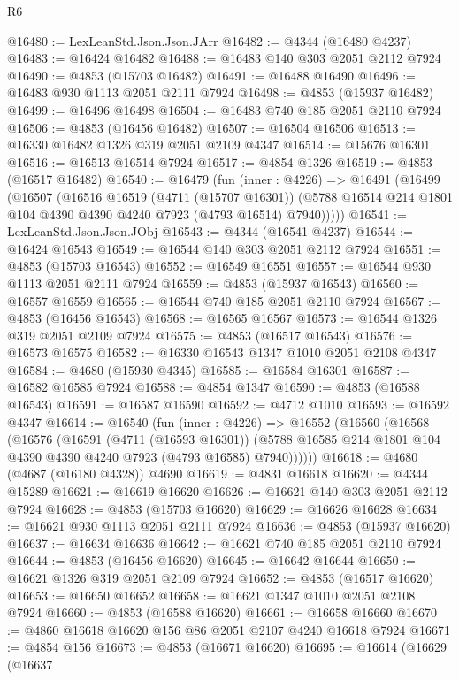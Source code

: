 \begin{lexlean}{R6}
\begin{coremodule}
@16480 := LexLeanStd.Json.Json.JArr
@16482 := @4344 (@16480 @4237)
@16483 := @16424 @16482
@16488 := @16483 @140 @303 @2051 @2112 @7924
@16490 := @4853 (@15703 @16482)
@16491 := @16488 @16490
@16496 := @16483 @930 @1113 @2051 @2111 @7924
@16498 := @4853 (@15937 @16482)
@16499 := @16496 @16498
@16504 := @16483 @740 @185 @2051 @2110 @7924
@16506 := @4853 (@16456 @16482)
@16507 := @16504 @16506
@16513 := @16330 @16482 @1326 @319 @2051 @2109 @4347
@16514 := @15676 @16301
@16516 := @16513 @16514 @7924
@16517 := @4854 @1326
@16519 := @4853 (@16517 @16482)
@16540 := @16479
    (fun (inner : @4226) =>
    @16491
      (@16499
        (@16507
          (@16516
            @16519
            (@4711 (@15707 @16301))
            (@5788 @16514 @214 @1801 @104 @4390 @4390 @4240 @7923 (@4793 @16514) @7940)))))
@16541 := LexLeanStd.Json.Json.JObj
@16543 := @4344 (@16541 @4237)
@16544 := @16424 @16543
@16549 := @16544 @140 @303 @2051 @2112 @7924
@16551 := @4853 (@15703 @16543)
@16552 := @16549 @16551
@16557 := @16544 @930 @1113 @2051 @2111 @7924
@16559 := @4853 (@15937 @16543)
@16560 := @16557 @16559
@16565 := @16544 @740 @185 @2051 @2110 @7924
@16567 := @4853 (@16456 @16543)
@16568 := @16565 @16567
@16573 := @16544 @1326 @319 @2051 @2109 @7924
@16575 := @4853 (@16517 @16543)
@16576 := @16573 @16575
@16582 := @16330 @16543 @1347 @1010 @2051 @2108 @4347
@16584 := @4680 (@15930 @4345)
@16585 := @16584 @16301
@16587 := @16582 @16585 @7924
@16588 := @4854 @1347
@16590 := @4853 (@16588 @16543)
@16591 := @16587 @16590
@16592 := @4712 @1010
@16593 := @16592 @4347
@16614 := @16540
    (fun (inner : @4226) =>
    @16552
      (@16560
        (@16568
          (@16576
            (@16591
              (@4711 (@16593 @16301))
              (@5788 @16585 @214 @1801 @104 @4390 @4390 @4240 @7923 (@4793 @16585) @7940))))))
@16618 := @4680 (@4687 (@16180 @4328)) @4690
@16619 := @4831 @16618
@16620 := @4344 @15289
@16621 := @16619 @16620
@16626 := @16621 @140 @303 @2051 @2112 @7924
@16628 := @4853 (@15703 @16620)
@16629 := @16626 @16628
@16634 := @16621 @930 @1113 @2051 @2111 @7924
@16636 := @4853 (@15937 @16620)
@16637 := @16634 @16636
@16642 := @16621 @740 @185 @2051 @2110 @7924
@16644 := @4853 (@16456 @16620)
@16645 := @16642 @16644
@16650 := @16621 @1326 @319 @2051 @2109 @7924
@16652 := @4853 (@16517 @16620)
@16653 := @16650 @16652
@16658 := @16621 @1347 @1010 @2051 @2108 @7924
@16660 := @4853 (@16588 @16620)
@16661 := @16658 @16660
@16670 := @4860 @16618 @16620 @156 @86 @2051 @2107 @4240 @16618 @7924
@16671 := @4854 @156
@16673 := @4853 (@16671 @16620)
@16695 := @16614
    (@16629
      (@16637

\end{coremodule}
\end{lexlean}
